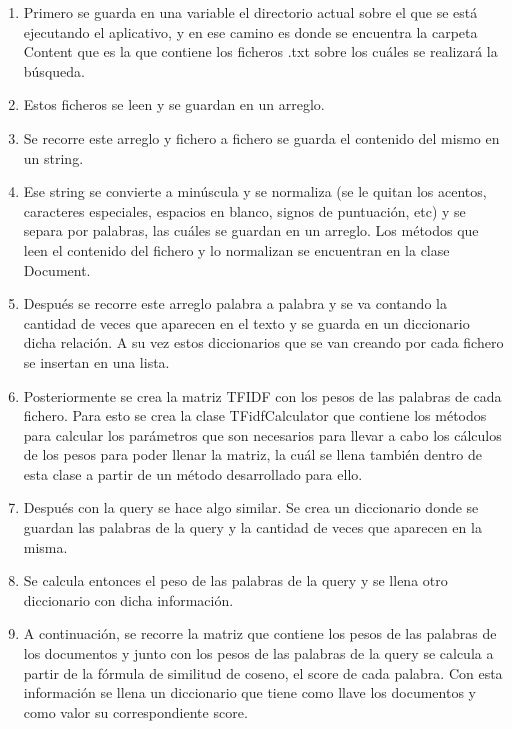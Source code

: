 \documentclass[spanish,10pt,a4paper]{article}
\begin{document}
	\begin{enumerate}
		\item Primero se guarda en una variable el directorio actual sobre el que se está ejecutando el aplicativo, y en ese camino es donde se encuentra la carpeta Content que es la que contiene los ficheros .txt sobre los cuáles se realizará la búsqueda.
		
		\item Estos ficheros se leen y se guardan en un arreglo.
		
		\item Se recorre este arreglo y fichero a fichero se guarda el contenido del mismo en un string.
		
		\item Ese string se convierte a minúscula y se normaliza (se le quitan los acentos, caracteres especiales, espacios en blanco, signos de puntuación, etc) y se separa por palabras, las cuáles se guardan en un arreglo.
		Los métodos que leen el contenido del fichero y lo normalizan se encuentran en la clase Document. 
		
		\item Después se recorre este arreglo palabra a palabra y se va contando la cantidad de veces que aparecen en el texto y se guarda en un diccionario dicha relación.
		A su vez estos diccionarios que se van creando por cada fichero se insertan en una lista.
		
		\item Posteriormente se crea la matriz TFIDF con los pesos de las palabras de cada fichero. 
		Para esto se crea la clase TFidfCalculator que contiene los métodos para calcular los parámetros que son necesarios para llevar a cabo los cálculos de los pesos para poder llenar la matriz, la cuál se llena también dentro de esta clase a partir de un método desarrollado para ello.
		
		\item Después con la query se hace algo similar.
		Se crea un diccionario donde se guardan las palabras de la query y la cantidad de veces que aparecen en la misma.
		
		\item Se calcula entonces el peso de las palabras de la query y se llena otro diccionario con dicha información.
		
		\item A continuación, se recorre la matriz que contiene los pesos de las palabras de los documentos y junto con los pesos de las palabras de la query se calcula a partir de la fórmula de similitud de coseno, el score de cada palabra.
		Con esta información se llena un diccionario que tiene como llave los documentos y como valor su correspondiente score.
		

\end{enumerate}
\end{document}
